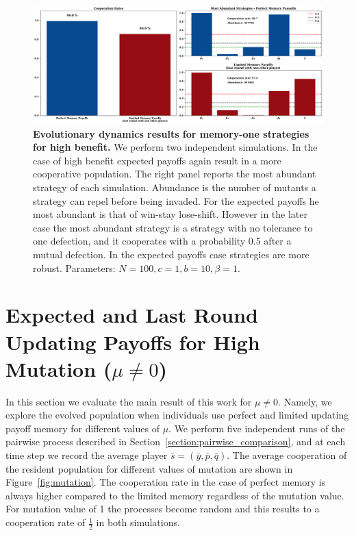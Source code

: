 \documentclass[11pt]{article}
\theoremstyle{plainCl1}
\theoremstyle{plainCl2}
\begin{document}
\begin{figure}[!htbp]
  \centering 
  \includegraphics[width=\textwidth]{static/memory_one_results_high_benefit.pdf}
  \caption{\textbf{Evolutionary dynamics results for memory-one strategies for high benefit.}
  We perform two independent simulations. In the case of high benefit expected
  payoffs again result in a more cooperative population. The right panel reports
  the most abundant strategy of each simulation. Abundance is the number of
  mutants a strategy can repel before being invaded. For the expected payoffs he
  most abundant is that of win-stay lose-shift. However in the later case the
  most abundant strategy is a strategy with no tolerance to one defection, and
  it cooperates with a probability 0.5 after a mutual defection.  In the expected
  payoffs case strategies are more robust.  Parameters: \(N =100, c=1, b=10,
  \beta=1\).}\label{fig:memory_one_high_benefit}
\end{figure}


\section{Expected and Last Round Updating Payoffs for High Mutation ($\mu \neq 0$)}\label{section:mutation}

In this section we evaluate the main result of this work for \(\mu \neq 0\).
Namely, we explore the evolved population when individuals use perfect and
limited updating payoff memory for different values of \(\mu\). We perform five
independent runs of the pairwise process described in
Section~\ref{section:pairwise_comparison}, and at each time step we record the
average player \(\bar{s}=(\bar{y}, \bar{p}, \bar{q})\). The average cooperation
of the resident population for different values of mutation are shown in
Figure~\ref{fig:mutation}. The cooperation rate in the case of perfect
memory is always higher compared to the limited memory regardless of the
mutation value. For mutation value of 1 the processes become random and
this results to a cooperation rate of \(\frac{1}{2}\) in both simulations.
\end{document}
